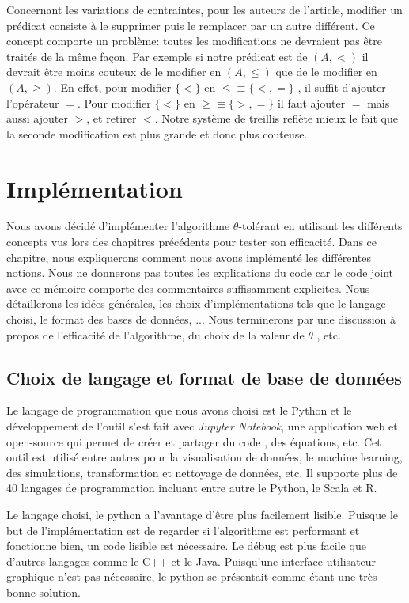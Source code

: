 \documentclass[letterpaper, 12pt]{report}
\theoremstyle{definition}
\begin{document}
Concernant les variations de contraintes, pour les auteurs de l'article, modifier un prédicat consiste à le supprimer puis le remplacer par un autre différent. Ce concept comporte un problème: toutes les modifications ne devraient pas être traités de la même façon. Par exemple si notre prédicat est de $(A,<)$ il devrait être moins couteux de le modifier en $(A,\leq)$ que de le modifier en $(A, \geq)$. En effet, pour modifier $\{ < \}$ en $ \leq \equiv \{<,= \}$ , il suffit d'ajouter l'opérateur $=$. Pour modifier $\{ <\}$ en $\geq \equiv \{ >,=\}$ il faut ajouter $=$ mais aussi ajouter $>$, et retirer $<$. Notre système de treillis reflète mieux le fait que la seconde modification est plus grande et donc plus couteuse.

\chapter{Implémentation}

Nous avons décidé d'implémenter l'algorithme $\theta$-tolérant en utilisant les différents concepts vus lors des chapitres précédents pour tester son efficacité. Dans ce chapitre, nous expliquerons comment nous avons implémenté les différentes notions. Nous ne donnerons pas toutes les explications du code car le code joint avec ce mémoire comporte des commentaires suffisamment explicites. Nous détaillerons les idées générales, les choix d'implémentations tels que le langage choisi, le format des bases de données, ... Nous terminerons par une discussion à propos de l'efficacité de l'algorithme, du choix de la valeur de $\theta$ , etc.

\section{Choix de langage et format de base de données}

Le langage de programmation que nous avons choisi est le Python et le développement de l'outil s'est fait avec \emph{Jupyter Notebook}, une application web et open-source qui permet de créer et partager du code , des équations, etc. Cet outil est utilisé entre autres pour la visualisation de données, le machine learning, des simulations, transformation et nettoyage de données, etc. Il supporte plus de 40 langages de programmation incluant entre autre le Python, le Scala et R.

Le langage choisi, le python a l'avantage d'être plus facilement lisible. Puisque le but de l'implémentation est de regarder si l'algorithme est performant et fonctionne bien, un code lisible est nécessaire. Le débug est plus facile que d'autres langages comme le C++ et le Java. Puisqu'une interface utilisateur graphique n'est pas nécessaire, le python se présentait comme étant une très bonne solution.
\end{document}
